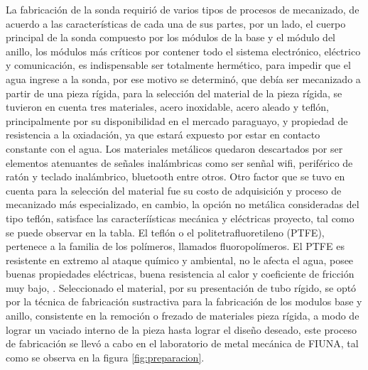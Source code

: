 La fabricaci\'on de la sonda requiri\'o de varios tipos de procesos de mecanizado, de acuerdo a las caracter\'isticas de cada una de sus partes, por un lado, el cuerpo principal de la sonda compuesto por los m\'odulos de la base y el m\'odulo del anillo, los m\'odulos más cr\'iticos por contener todo el sistema electr\'onico, el\'ectrico y comunicaci\'on, es indispensable ser totalmente herm\'etico, para impedir que el agua ingrese a la sonda, por ese motivo se determin\'o, que deb\'ia ser mecanizado a partir de una pieza r\'igida, para la selecci\'on del material de la pieza rígida, se tuvieron en cuenta tres materiales, acero inoxidable, acero aleado y tefl\'on, principalmente por su disponibilidad en el mercado paraguayo, y propiedad de resistencia a la oxiadaci\'on, ya que estar\'a expuesto por estar en contacto constante con el agua. 
Los materiales met\'alicos quedaron descartados por ser elementos atenuantes de se\~nales inal\'ambricas como ser sen\~nal wifi, perif\'erico de rat\'on y teclado inal\'ambrico, bluetooth entre otros. Otro factor que se tuvo en cuenta para la selecci\'on del material fue su costo de adquisici\'on  y proceso de mecanizado m\'as especializado, en cambio, la opción no met\'alica consideradas del tipo tefl\'on, satisface las caracterí\'isticas mec\'anica y el\'ectricas proyecto, tal como se puede observar en la tabla. 
El tefl\'on o el politetrafluoretileno (PTFE), pertenece a la familia de los pol\'imeros, llamados fluoropol\'imeros. El PTFE es resistente en extremo al ataque qu\'imico y ambiental, no le afecta el agua, posee buenas propiedades el\'ectricas, buena resistencia al calor y coeficiente de fricci\'on muy bajo, \cite{groover_fundamentos_1997}.
Seleccionado el material, por su presentaci\'on de tubo r\'igido, se opt\'o por la t\'ecnica de fabricaci\'on sustractiva para la fabricaci\'on de los modulos base y anillo, consistente en la remoci\'on o frezado de materiales pieza r\'igida, a modo de lograr un vaciado interno de la pieza hasta lograr el dise\~no deseado, este proceso de fabricaci\'on se llev\'o a cabo en el laboratorio de metal mec\'anica de FIUNA, tal como se observa en la figura \ref{fig:preparacion}.

